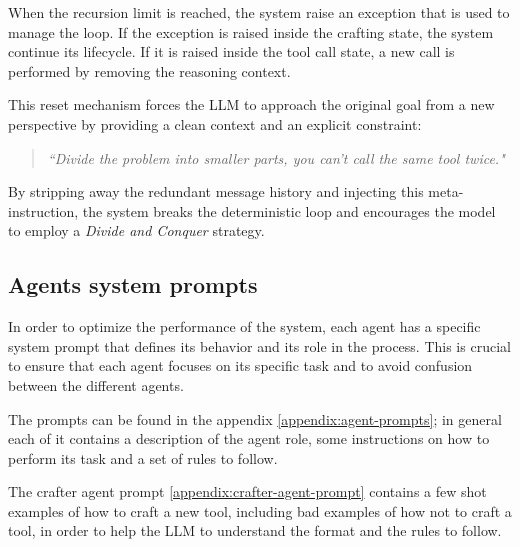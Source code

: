 \documentclass[12pt,a4paper,openright,twoside]{book}
\begin{document}
When the recursion limit is reached, the system raise an exception that is used to manage the loop. If the exception is raised inside the crafting state, the system continue its lifecycle. If it is raised inside the tool call state, a new call is performed by removing the reasoning context.

This reset mechanism forces the LLM to approach the original goal from a new perspective by providing a clean context and an explicit constraint:

\begin{quote}
\textit{``Divide the problem into smaller parts, you can't call the same tool twice."}
\end{quote}

By stripping away the redundant message history and injecting this meta-instruction, the system breaks the deterministic loop and encourages the model to employ a \textit{Divide and Conquer} strategy.

\subsection{Agents system prompts}
In order to optimize the performance of the system, each agent has a specific system prompt that defines its behavior and its role in the process. This is crucial to ensure that each agent focuses on its specific task and to avoid confusion between the different agents.

The prompts can be found in the appendix \cref{appendix:agent-prompts}; in general each of it contains a description of the agent role, some instructions on how to perform its task and a set of rules to follow. 

The crafter agent prompt \cref{appendix:crafter-agent-prompt} contains a few shot examples of how to craft a new tool, including bad examples of how not to craft a tool, in order to help the LLM to understand the format and the rules to follow.
\end{document}

